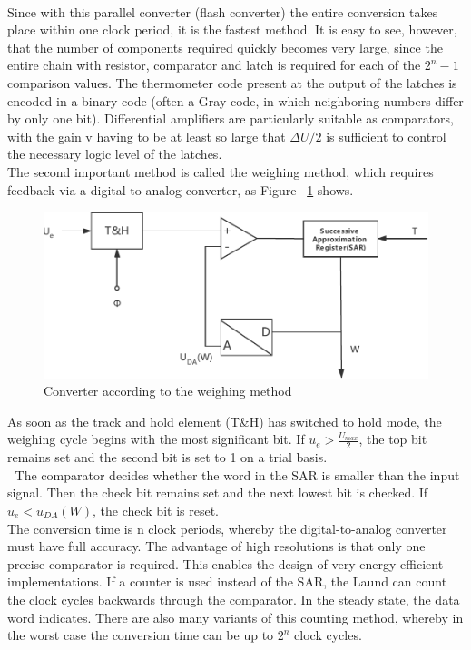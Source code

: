 \\
Since with this parallel converter (flash converter) the entire conversion takes place within one clock period, it is the fastest method. It is easy to see, however, that the number of components required quickly becomes very large, since the entire chain with resistor, comparator and latch is required for each of the $2^{n}-1$ comparison values. The thermometer code present at the output of the latches is encoded in a binary code (often a Gray code, in which neighboring numbers differ by only one bit). Differential amplifiers are particularly suitable as comparators, with the gain v having to be at least so large that $\Delta U/2$ is sufficient to control the necessary logic level of the latches.
\\
The second important method is called the weighing method, which requires feedback via a digital-to-analog converter, as Figure ~\ref{fig:2.4} shows.
\begin{figure}[h]
	\centering
	\includegraphics[width=13cm]{grafiken/2.4.pdf}
	\caption{Converter according to the weighing method} 
	\label{fig:2.4}
\end{figure}
 As soon as the track and hold element (T\&H) has switched to hold mode, the weighing cycle begins with the most significant bit. If $ u_{e}>\frac{U_{max}}{2} $, the top bit remains set and the second bit is set to 1 on a trial basis.
\\ 
The comparator decides whether the word in the SAR is smaller than the input signal. Then the check bit remains set and the next lowest bit is checked. If  $u_{e}<u_{DA}(W)$, the check bit is reset.
\\
The conversion time is n clock periods, whereby the digital-to-analog converter must have full accuracy. The advantage of high resolutions is that only one precise comparator is required. This enables the design of very energy efficient implementations.
If a counter is used instead of the SAR, the Laund can count the clock cycles backwards through the comparator. In the steady state, the data word indicates. There are also many variants of this counting method, whereby in the worst case the conversion time can be up to $2^{n}$ clock cycles.
